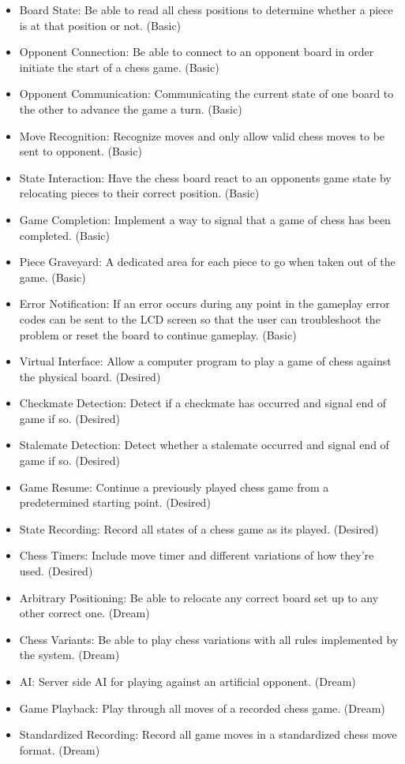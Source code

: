 \documentclass{article}
\begin{document}
\begin{itemize}


	\item Board State: Be able to read all chess positions to determine whether a piece is at that position or not. (Basic)
	\item Opponent Connection: Be able to connect to an opponent board in order initiate the start of a chess game. (Basic)
	\item Opponent Communication: Communicating the current state of one board to the other to advance the game a turn. (Basic)
	\item Move Recognition: Recognize moves and only allow valid chess moves to be sent to opponent. (Basic)
	\item State Interaction: Have the chess board react to an opponents game state by relocating pieces to their correct position. (Basic)
	\item Game Completion: Implement a way to signal that a game of chess has been completed. (Basic)
	\item Piece Graveyard: A dedicated area for each piece to go when taken out of the game. (Basic)
	\item Error Notification: If an error occurs during any point in the gameplay error codes can be sent to the LCD screen so that the user can troubleshoot the problem or reset the board to continue gameplay. (Basic)


	\item Virtual Interface: Allow a computer program to play a game of chess against the physical board. (Desired)
	\item Checkmate Detection: Detect if a checkmate has occurred and signal end of game if so. (Desired)
	\item Stalemate Detection: Detect whether a stalemate occurred and signal end of game if so. (Desired)
	\item Game Resume: Continue a previously played chess game from a predetermined starting point. (Desired)
	\item State Recording: Record all states of a chess game as its played. (Desired)
	\item Chess Timers: Include move timer and different variations of how they're used. (Desired)


	\item Arbitrary Positioning: Be able to relocate any correct board set up to any other correct one. (Dream)
	\item Chess Variants: Be able to play chess variations with all rules implemented by the system. (Dream)
	\item AI: Server side AI for playing against an artificial opponent. (Dream)
	\item Game Playback: Play through all moves of a recorded chess game. (Dream)
	\item Standardized Recording: Record all game moves in a standardized chess move format. (Dream)

\end{itemize}
\end{document}
